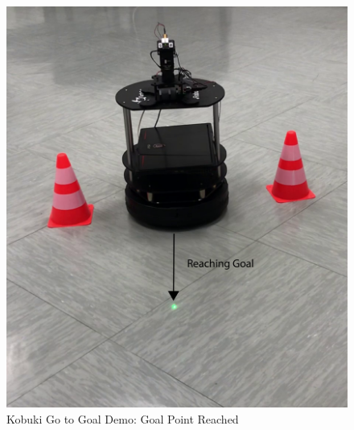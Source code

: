 \begin{figure}
	\centering
	\includegraphics[width=\textwidth]{img/kgtgGoal.png}%
	\caption{Kobuki Go to Goal Demo: Goal Point Reached}
	\label{fig:kgtgGoal}
\end{figure}